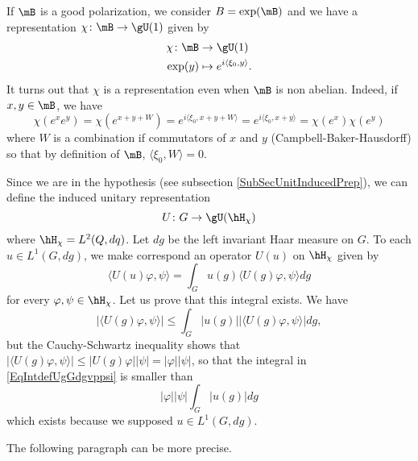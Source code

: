 If $\mB$ is a good polarization, we consider $B=\exp(\mB)$ and we have a representation $\chi\colon \mB\to \gU(1)$ given by
\begin{equation}
	\begin{aligned}
		\chi\colon \mB&\to \gU(1) \\
		\exp(y)&\mapsto  e^{i\langle \xi_0, y\rangle }. 
	\end{aligned}
\end{equation}
It turns out that $\chi$ is a representation even when $\mB$ is non abelian. Indeed, if $x,y\in\mB$, we have
\begin{equation}
	\chi( e^{x} e^{y})=\chi( e^{x+y+W})= e^{i\langle \xi_0, x+y+W\rangle }= e^{i\langle \xi_0, x+y\rangle }= \chi( e^{x})\chi( e^{y})
\end{equation}
where $W$ is a combination if commutators of $x$ and $y$ (Campbell-Baker-Hausdorff) so that by definition of $\mB$, $\langle \xi_0, W\rangle =0$.

Since we are in the hypothesis (see subsection \ref{SubSecUnitInducedPrep}), we can define the induced unitary representation
\begin{equation}
	U\colon G\to \gU(\hH_{\chi})
\end{equation}
where $\hH_{\chi}=L^2(Q,dq)$. Let $dg$ be the left invariant Haar measure on $G$.  To each $u\in L^1(G,dg)$, we make correspond an operator $U(u)$ on $\hH_{\chi}$ given by
\begin{equation}	\label{EqDefUudansHh}
	\langle U(u)\varphi, \psi\rangle =\int_Gu(g)\langle U(g)\varphi, \psi\rangle dg
\end{equation}
for every $\varphi,\psi\in\hH_{\chi}$. Let us prove that this integral exists. We have
\begin{equation}	\label{EqIntdefUgGdgvppsi}
		| \langle U(g)\varphi, \psi\rangle  |\leq\int_G| u(g) | |\langle U(g)\varphi, \psi\rangle  |dg,
\end{equation}
but the Cauchy-Schwartz inequality shows that $| \langle U(g)\varphi, \psi\rangle  |\leq| U(g)\varphi | |\psi |=| \varphi | |\psi |$, so that the integral in \eqref{EqIntdefUgGdgvppsi} is smaller than
\begin{equation}
	| \varphi | | \psi |  \int_G| u(g) |dg
\end{equation}
which exists because we supposed $u\in L^1(G,dg)$.

\begin{probleme}
	The following paragraph can be more precise.
\end{probleme}

